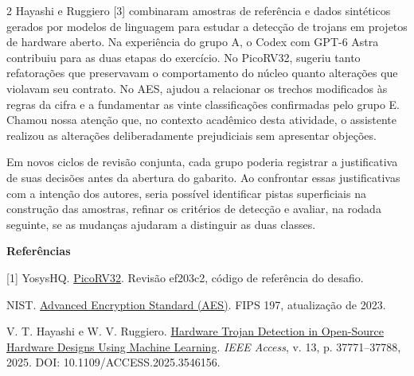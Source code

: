 \documentclass[10pt,a4paper]{article}
\newcommand{\tema}[1]{\par\medskip\noindent\textbf{#1}\par}
\begin{document}
\begin{multicols}{2}
Hayashi e Ruggiero [3] combinaram amostras de referência e dados sintéticos gerados por modelos de linguagem para estudar a detecção de trojans em projetos de hardware aberto. Na experiência do grupo A, o Codex com GPT-6 Astra contribuiu para as duas etapas do exercício. No PicoRV32, sugeriu tanto refatorações que preservavam o comportamento do núcleo quanto alterações que violavam seu contrato. No AES, ajudou a relacionar os trechos modificados às regras da cifra e a fundamentar as vinte classificações confirmadas pelo grupo E. Chamou nossa atenção que, no contexto acadêmico desta atividade, o assistente realizou as alterações deliberadamente prejudiciais sem apresentar objeções.

Em novos ciclos de revisão conjunta, cada grupo poderia registrar a justificativa de suas decisões antes da abertura do gabarito. Ao confrontar essas justificativas com a intenção dos autores, seria possível identificar pistas superficiais na construção das amostras, refinar os critérios de detecção e avaliar, na rodada seguinte, se as mudanças ajudaram a distinguir as duas classes.

\tema{Referências}
{\small [1] YosysHQ. \href{https://github.com/YosysHQ/picorv32}{PicoRV32}. Revisão ef203c2, código de referência do desafio.\par
[2] NIST. \href{https://doi.org/10.6028/NIST.FIPS.197-upd1}{Advanced Encryption Standard (AES)}. FIPS 197, atualização de 2023.\par
[3] V. T. Hayashi e W. V. Ruggiero. \href{https://doi.org/10.1109/ACCESS.2025.3546156}{Hardware Trojan Detection in Open-Source Hardware Designs Using Machine Learning}. \textit{IEEE Access}, v. 13, p. 37771--37788, 2025. DOI: 10.1109/ACCESS.2025.3546156.\par}
\end{multicols}
\end{document}
